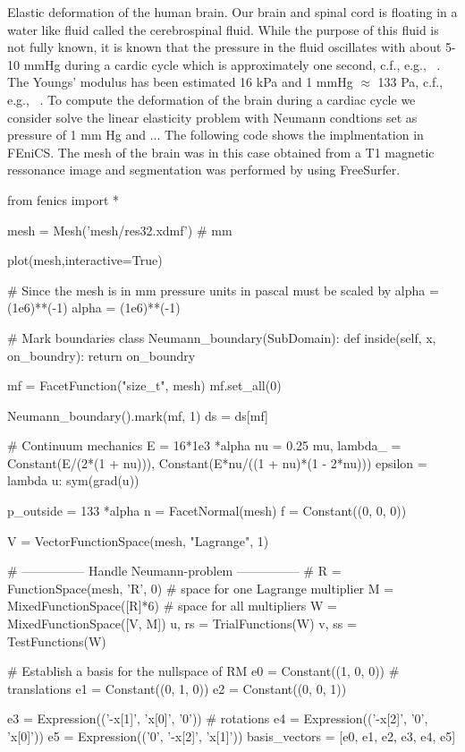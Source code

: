 \begin{example}{Elastic deformation of the human brain.}
Our brain and spinal cord is floating in a water like fluid called the cerebrospinal fluid.
While the purpose of this fluid is not fully known, it is known that the pressure in
the fluid oscillates with about 5-10 mmHg during a cardic cycle which is approximately one
second, c.f., e.g., ~\cite{eide2016correlation}. The Youngs' modulus has been estimated 16 kPa
and 1 mmHg $\approx$ 133 Pa, c.f., e.g., ~\cite{stoverud2016poro}. To compute the deformation of the brain during a
cardiac cycle we consider solve the linear elasticity problem with Neumann condtions
set as pressure of 1 mm Hg and ... The following code shows the implmentation in FEniCS.
The mesh of the brain was in this case obtained from a T1 magnetic ressonance image
and segmentation was performed by using FreeSurfer. 

\begin{python}
from fenics import *

mesh = Mesh('mesh/res32.xdmf')	# mm

plot(mesh,interactive=True)

# Since the mesh is in mm pressure units in pascal must be scaled by alpha = (1e6)**(-1)
alpha = (1e6)**(-1)

# Mark boundaries
class Neumann_boundary(SubDomain):
	def inside(self, x, on_boundry):
		return on_boundry

mf = FacetFunction("size_t", mesh)
mf.set_all(0)

Neumann_boundary().mark(mf, 1)
ds = ds[mf]

# Continuum mechanics
E = 16*1e3 *alpha
nu = 0.25
mu, lambda_ = Constant(E/(2*(1 + nu))), Constant(E*nu/((1 + nu)*(1 - 2*nu)))
epsilon = lambda u: sym(grad(u))

p_outside = 133 *alpha
n = FacetNormal(mesh)
f = Constant((0, 0, 0))

V = VectorFunctionSpace(mesh, "Lagrange", 1)

# --------------- Handle Neumann-problem --------------- #
R = FunctionSpace(mesh, 'R', 0)        		 # space for one Lagrange multiplier
M = MixedFunctionSpace([R]*6)          		 # space for all multipliers
W = MixedFunctionSpace([V, M])
u, rs = TrialFunctions(W)
v, ss = TestFunctions(W)

# Establish a basis for the nullspace of RM
e0 = Constant((1, 0, 0))				# translations
e1 = Constant((0, 1, 0))
e2 = Constant((0, 0, 1))

e3 = Expression(('-x[1]', 'x[0]', '0')) # rotations
e4 = Expression(('-x[2]', '0', 'x[0]'))
e5 = Expression(('0', '-x[2]', 'x[1]'))
basis_vectors = [e0, e1, e2, e3, e4, e5]


\end{python}
\end{example}
